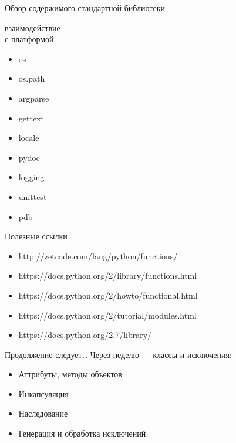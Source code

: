 \documentclass[hyperref={pdftex,unicode}]{beamer}
\begin{document}
\begin{frame}{Обзор содержимого стандартной библиотеки}
{\begin{minipage}{0.2\linewidth}
      взаимодействие \\
      с платформой
    \begin{itemize}
    \item os
    \item os.path
    \item argparse
    \item gettext
    \item locale
    \item pydoc
    \item logging
    \item unittest
    \item pdb    
    \end{itemize}
  \end{minipage}
}
\end{frame}

\begin{frame}{Полезные ссылки}
  \begin{itemize}
    \item http://zetcode.com/lang/python/functions/
    \item https://docs.python.org/2/library/functions.html
    \item https://docs.python.org/2/howto/functional.html
    \item https://docs.python.org/2/tutorial/modules.html
    \item https://docs.python.org/2.7/library/
  \end{itemize}
\end{frame}

\begin{frame}{Продолжение следует\dots}
  Через неделю --- классы и исключения:
  \begin{itemize}
  \item Аттрибуты, методы объектов
  \item Инкапсуляция
  \item Наследование
  \item Генерация и обработка исключений
  \end{itemize}
\end{frame}
\end{document}
